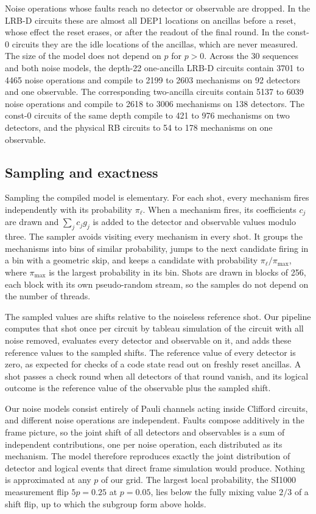 Noise operations whose faults reach no detector or observable are dropped. In the LRB-D circuits these are almost all DEP1 locations on ancillas before a reset, whose effect the reset erases, or after the readout of the final round. In the const-0 circuits they are the idle locations of the ancillas, which are never measured. The size of the model does not depend on $p$ for $p > 0$. Across the 30 sequences and both noise models, the depth-22 one-ancilla LRB-D circuits contain 3701 to 4465 noise operations and compile to 2199 to 2603 mechanisms on 92 detectors and one observable. The corresponding two-ancilla circuits contain 5137 to 6039 noise operations and compile to 2618 to 3006 mechanisms on 138 detectors. The const-0 circuits of the same depth compile to 421 to 976 mechanisms on two detectors, and the physical RB circuits to 54 to 178 mechanisms on one observable.

\subsection{Sampling and exactness}

Sampling the compiled model is elementary. For each shot, every mechanism fires independently with its probability $\pi_\ell$. When a mechanism fires, its coefficients $c_j$ are drawn and $\sum_j c_j g_j$ is added to the detector and observable values modulo three. The sampler avoids visiting every mechanism in every shot. It groups the mechanisms into bins of similar probability, jumps to the next candidate firing in a bin with a geometric skip, and keeps a candidate with probability $\pi_\ell / \pi_{\max}$, where $\pi_{\max}$ is the largest probability in its bin. Shots are drawn in blocks of 256, each block with its own pseudo-random stream, so the samples do not depend on the number of threads.

The sampled values are shifts relative to the noiseless reference shot. Our pipeline computes that shot once per circuit by tableau simulation of the circuit with all noise removed, evaluates every detector and observable on it, and adds these reference values to the sampled shifts. The reference value of every detector is zero, as expected for checks of a code state read out on freshly reset ancillas. A shot passes a check round when all detectors of that round vanish, and its logical outcome is the reference value of the observable plus the sampled shift.

Our noise models consist entirely of Pauli channels acting inside Clifford circuits, and different noise operations are independent. Faults compose additively in the frame picture, so the joint shift of all detectors and observables is a sum of independent contributions, one per noise operation, each distributed as its mechanism. The model therefore reproduces exactly the joint distribution of detector and logical events that direct frame simulation would produce. Nothing is approximated at any $p$ of our grid. The largest local probability, the SI1000 measurement flip $5p = 0.25$ at $p = 0.05$, lies below the fully mixing value $2/3$ of a shift flip, up to which the subgroup form above holds.

